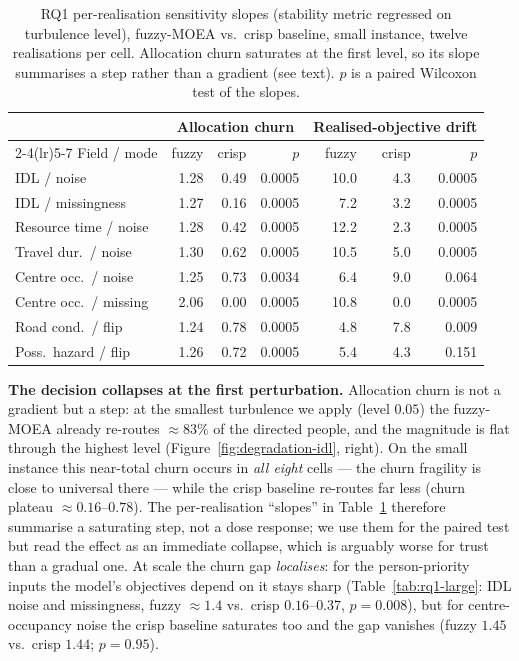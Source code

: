 \documentclass[systems,article,submit,moreauthors,pdftex]{Definitions/mdpi}
\begin{document}
\begin{table}[H]
\centering
\caption{RQ1 per-realisation sensitivity slopes (stability metric regressed on turbulence
level), fuzzy-MOEA vs.\ crisp baseline, small instance, twelve realisations per cell.
Allocation churn saturates at the first level, so its slope summarises a step rather than a
gradient (see text). $p$ is a paired Wilcoxon test of the slopes.\label{tab:rq1}}
\small
\begin{tabular}{lrrrrrr}
\toprule
& \multicolumn{3}{c}{Allocation churn} & \multicolumn{3}{c}{Realised-objective drift}\\
\cmidrule(lr){2-4}\cmidrule(lr){5-7}
Field / mode & fuzzy & crisp & $p$ & fuzzy & crisp & $p$\\
\midrule
IDL / noise            & 1.28 & 0.49 & 0.0005 & 10.0 & 4.3 & 0.0005\\
IDL / missingness      & 1.27 & 0.16 & 0.0005 &  7.2 & 3.2 & 0.0005\\
Resource time / noise  & 1.28 & 0.42 & 0.0005 & 12.2 & 2.3 & 0.0005\\
Travel dur.\ / noise   & 1.30 & 0.62 & 0.0005 & 10.5 & 5.0 & 0.0005\\
Centre occ.\ / noise   & 1.25 & 0.73 & 0.0034 &  6.4 & 9.0 & 0.064\\
Centre occ.\ / missing & 2.06 & 0.00 & 0.0005 & 10.8 & 0.0 & 0.0005\\
Road cond.\ / flip     & 1.24 & 0.78 & 0.0005 &  4.8 & 7.8 & 0.009\\
Poss.\ hazard / flip   & 1.26 & 0.72 & 0.0005 &  5.4 & 4.3 & 0.151\\
\bottomrule
\end{tabular}
\end{table}

\textbf{The decision collapses at the first perturbation.} Allocation churn is not a gradient
but a step: at the smallest turbulence we apply (level $0.05$) the fuzzy-MOEA already re-routes
$\approx 83\%$ of the directed people, and the magnitude is flat through the highest level
(Figure~\ref{fig:degradation-idl}, right). On the small instance this near-total churn occurs
in \emph{all eight} cells --- the churn fragility is close to universal there --- while the
crisp baseline re-routes far less (churn plateau $\approx 0.16$--$0.78$). The per-realisation
``slopes'' in Table~\ref{tab:rq1} therefore summarise a saturating step, not a dose response;
we use them for the paired test but read the effect as an immediate collapse, which is arguably
worse for trust than a gradual one. At scale the churn gap \emph{localises}: for the
person-priority inputs the model's objectives depend on it stays sharp
(Table~\ref{tab:rq1-large}: IDL noise and missingness, fuzzy $\approx 1.4$ vs.\ crisp
$0.16$--$0.37$, $p = 0.008$), but for centre-occupancy noise the crisp baseline saturates too
and the gap vanishes (fuzzy $1.45$ vs.\ crisp $1.44$; $p = 0.95$).
\end{document}
